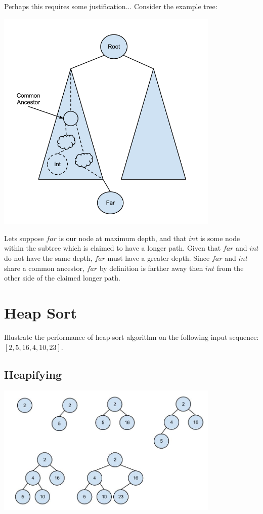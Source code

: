 \documentclass[12pt]{article}
\begin{document}
Perhaps this requires some justification... Consider the example tree:
\begin{center}
\includegraphics[width=0.8\textwidth]{figures/diameter2.png}
\end{center}
Lets suppose $far$ is our node at maximum depth, and that $int$ is some node within the subtree which is claimed to have a longer path. Given that $far$ and $int$ do not have the same depth, $far$ must have a greater depth. Since $far$ and $int$ share a common ancestor, $far$ by definition is farther away then $int$ from the other side of the claimed longer path.


\section{Heap Sort}
Illustrate the performance of heap-sort algorithm on the following input sequence: $[2,5,16,4,10,23]$. \\
\subsection{Heapifying}
\begin{center}
\includegraphics[width=0.8\textwidth]{figures/heapsort.jpg}
\end{center}
\end{document}
